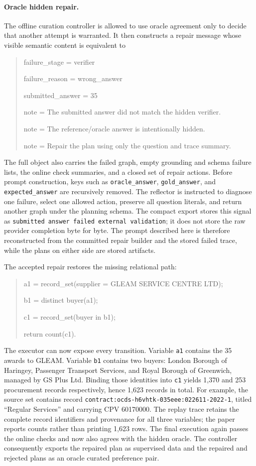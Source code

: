 \documentclass{article}
\begin{document}
\paragraph{Oracle hidden repair.}
The offline curation controller is allowed to use oracle agreement only to decide that another
attempt is warranted.  It then constructs a repair message whose visible semantic content is
equivalent to
\begin{quote}\small\ttfamily
failure\_stage = verifier\par
failure\_reason = wrong\_answer\par
submitted\_answer = 35\par
note = The submitted answer did not match the hidden verifier.\par
note = The reference/oracle answer is intentionally hidden.\par
note = Repair the plan using only the question and trace summary.
\end{quote}
The full object also carries the failed graph, empty grounding and schema failure lists, the online
check summaries, and a closed set of repair actions.  Before prompt construction, keys such as
\texttt{oracle\_answer}, \texttt{gold\_answer}, and \texttt{expected\_answer} are recursively
removed.  The reflector is instructed to diagnose one failure, select one allowed action, preserve
all question literals, and return another graph under the planning schema.  The compact export
stores this signal as \texttt{submitted answer failed external validation}; it does not store the
raw provider completion byte for byte.  The prompt described here is therefore reconstructed from
the committed repair builder and the stored failed trace, while the plans on either side are stored
artifacts.

The accepted repair restores the missing relational path:
\begin{quote}\small\ttfamily
a1 = record\_set(supplier = GLEAM SERVICE CENTRE LTD);\par
b1 = distinct buyer(a1);\par
c1 = record\_set(buyer in b1);\par
return count(c1).
\end{quote}
The executor can now expose every transition.  Variable \texttt{a1} contains the 35 awards to
GLEAM.  Variable \texttt{b1} contains two buyers: London Borough of Haringey, Passenger Transport
Services, and Royal Borough of Greenwich, managed by GS Plus Ltd.  Binding those identities into
\texttt{c1} yields 1,370 and 253 procurement records respectively, hence 1,623 records in total.
For example, the source set contains record
\texttt{contract:ocds-h6vhtk-035eee:022611-2022-1}, titled ``Regular Services'' and carrying CPV
60170000.  The replay trace retains the complete record identifiers and provenance for all three
variables; the paper reports counts rather than printing 1,623 rows.
The final execution again passes the online checks and now also agrees with the hidden oracle.  The
controller consequently exports the repaired plan as supervised data and the repaired and rejected
plans as an oracle curated preference pair.
\end{document}
